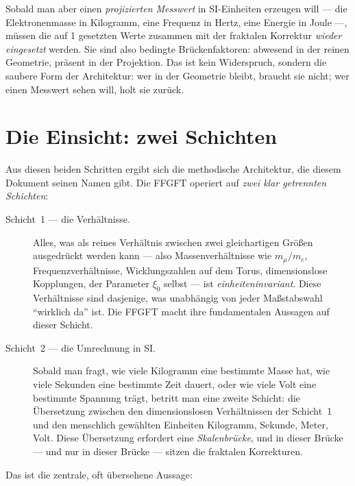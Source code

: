Sobald man aber einen \emph{projizierten Messwert} in SI-Einheiten
erzeugen will --- die Elektronenmasse in Kilogramm, eine Frequenz in
Hertz, eine Energie in Joule ---, müssen die auf 1 gesetzten Werte
zusammen mit der fraktalen Korrektur \emph{wieder eingesetzt} werden.
Sie sind also bedingte Brückenfaktoren: abwesend in der reinen
Geometrie, präsent in der Projektion. Das ist kein Widerspruch, sondern
die saubere Form der Architektur: wer in der Geometrie bleibt, braucht
sie nicht; wer einen Messwert sehen will, holt sie zurück.

\section{Die Einsicht: zwei Schichten}

Aus diesen beiden Schritten ergibt sich die methodische Architektur, die
diesem Dokument seinen Namen gibt. Die FFGFT operiert auf \emph{zwei klar
getrennten Schichten}:

\begin{description}
  \item[Schicht~1 --- die Verhältnisse.] Alles, was als reines Verhältnis
    zwischen zwei gleichartigen Größen ausgedrückt werden kann --- also
    Massenverhältnisse wie $m_{\mu}/m_{e}$, Frequenzverhältnisse,
    Wicklungszahlen auf dem Torus, dimensionslose Kopplungen, der Parameter
    $\xi_{0}$ selbst --- ist \emph{einheiteninvariant}. Diese Verhältnisse
    sind dasjenige, was unabhängig von jeder Maßstabswahl ``wirklich da''
    ist. Die FFGFT macht ihre fundamentalen Aussagen auf dieser Schicht.

  \item[Schicht~2 --- die Umrechnung in SI.] Sobald man fragt, wie viele
    Kilogramm eine bestimmte Masse hat, wie viele Sekunden eine bestimmte
    Zeit dauert, oder wie viele Volt eine bestimmte Spannung trägt, betritt
    man eine zweite Schicht: die Übersetzung zwischen den dimensionslosen
    Verhältnissen der Schicht~1 und den menschlich gewählten Einheiten
    Kilogramm, Sekunde, Meter, Volt. Diese Übersetzung erfordert eine
    \emph{Skalenbrücke}, und in dieser Brücke --- und nur in dieser Brücke
    --- sitzen die fraktalen Korrekturen.
\end{description}

Das ist die zentrale, oft übersehene Aussage:

\begin{center}
\end{center}

